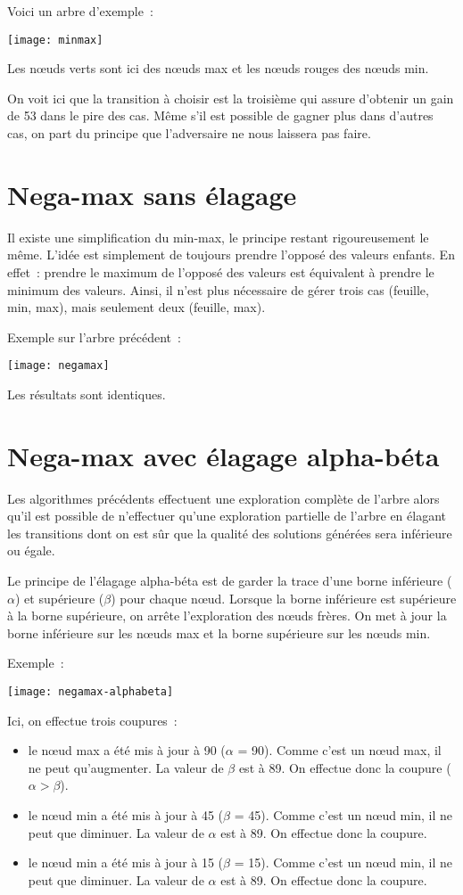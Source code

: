 Voici un arbre d'exemple :

\texttt{[image: minmax]}

Les nœuds verts sont ici des nœuds max et les nœuds rouges des nœuds min.

On voit ici que la transition à choisir est la troisième qui assure d'obtenir un gain de 53 dans le pire des cas.
Même s'il est possible de gagner plus dans d'autres cas, on part du principe que l'adversaire ne nous laissera pas faire.

\section{Nega-max sans élagage}

Il existe une simplification du min-max, le principe restant rigoureusement le même.
L'idée est simplement de toujours prendre l'opposé des valeurs enfants.
En effet : prendre le maximum de l'opposé des valeurs est équivalent à prendre le minimum des valeurs.
Ainsi, il n'est plus nécessaire de gérer trois cas (feuille, min, max), mais seulement deux (feuille, max).

Exemple sur l'arbre précédent :

\texttt{[image: negamax]}

Les résultats sont identiques.

\section{Nega-max avec élagage alpha-béta}

Les algorithmes précédents effectuent une exploration complète de l'arbre alors qu'il est possible de n'effectuer
qu'une exploration partielle de l'arbre en élagant les transitions dont on est sûr que la qualité des solutions générées
sera inférieure ou égale.

Le principe de l'élagage alpha-béta est de garder la trace d'une borne inférieure (\(\alpha\)) et supérieure (\(\beta\))
pour chaque nœud. Lorsque la borne inférieure est supérieure à la borne supérieure, on arrête l'exploration des nœuds frères.
On met à jour la borne inférieure sur les nœuds max et la borne supérieure sur les nœuds min.

Exemple :

\texttt{[image: negamax-alphabeta]}

Ici, on effectue trois coupures :
\begin{itemize}
    \item le nœud max a été mis à jour à 90 (\(\alpha\) = 90). Comme c'est un nœud max, il ne peut qu'augmenter.
        La valeur de \(\beta\) est à 89. On effectue donc la coupure (\(\alpha > \beta\)).
    \item le nœud min a été mis à jour à 45 (\(\beta\) = 45). Comme c'est un nœud min, il ne peut que diminuer.
        La valeur de \(\alpha\) est à 89. On effectue donc la coupure.
    \item le nœud min a été mis à jour à 15 (\(\beta\) = 15). Comme c'est un nœud min, il ne peut que diminuer.
        La valeur de \(\alpha\) est à 89. On effectue donc la coupure.
\end{itemize}


